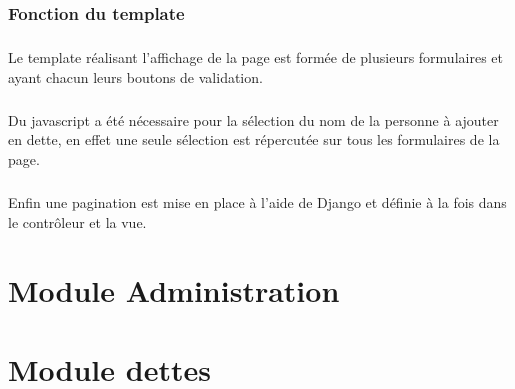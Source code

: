 \documentclass[twoside,UTF8]{EPURapport}
\begin{document}
        \subsection{Fonction du template}

            \paragraph{}Le template réalisant l'affichage de la page est formée de plusieurs formulaires et ayant chacun leurs boutons de validation.

            \paragraph{}Du javascript a été nécessaire pour la sélection du nom de la personne à ajouter en dette, en effet une seule sélection est répercutée sur tous les formulaires de la page.

            \paragraph{}Enfin une pagination est mise en place à l'aide de Django et définie à la fois dans le contrôleur et la vue.%

\chapter{Module Administration}

\chapter{Module dettes}

\end{document}
